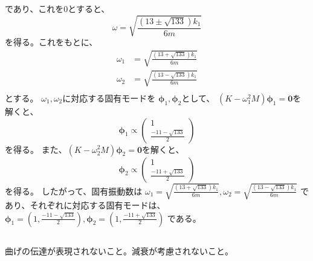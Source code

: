 \documentclass[a4paper]{jsarticle}
\begin{document}
であり、これを0とすると、
\begin{equation}
  \omega = \sqrt{\frac{(13 \pm \sqrt{133}) k_1}{6m}}
\end{equation}
を得る。これをもとに、
\begin{align}
  \omega_1 &= \sqrt{\frac{(13 + \sqrt{133}) k_1}{6m}} \\
  \omega_2 &= \sqrt{\frac{(13 - \sqrt{133}) k_1}{6m}} \\
\end{align}
とする。
$\omega_1, \omega_2$に対応する固有モードを
$\boldsymbol{\phi}_1, \boldsymbol{\phi}_2$として、
$(K - \omega_1^2 M) \boldsymbol{\phi}_1 = \boldsymbol{0}$を解くと、
\begin{equation}
  \boldsymbol{\phi}_1 \propto
  \begin{pmatrix}
    1 \\
    \frac{-11 - \sqrt{133}}{2}
  \end{pmatrix}
\end{equation}
を得る。
また、$(K - \omega_2^2 M) \boldsymbol{\phi}_2 = \boldsymbol{0}$を解くと、
\begin{equation}
  \boldsymbol{\phi}_2 \propto
  \begin{pmatrix}
    1 \\
    \frac{-11 + \sqrt{133}}{2}
  \end{pmatrix}
\end{equation}
を得る。
したがって、固有振動数は
$\omega_1 = \sqrt{\frac{(13 + \sqrt{133}) k_1}{6m}}, \omega_2 = \sqrt{\frac{(13 - \sqrt{133}) k_1}{6m}}$
であり、それぞれに対応する固有モードは、
$\boldsymbol{\phi}_1 = \left(1, \frac{-11-\sqrt{133}}{2}\right),\boldsymbol{\phi}_2 = \left(1, \frac{-11+\sqrt{133}}{2}\right)$
である。

\subsection{}
曲げの伝達が表現されないこと。減衰が考慮されないこと。
\end{document}
